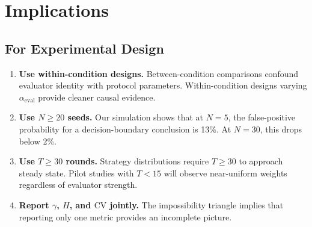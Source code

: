\documentclass[11pt]{article}
\begin{document}
\section{Implications}

\subsection{For Experimental Design}

\begin{enumerate}[leftmargin=*,nosep]
 \item \textbf{Use within-condition designs.} Between-condition comparisons confound evaluator identity with protocol parameters. Within-condition designs varying $\alpha_{\text{eval}}$ provide cleaner causal evidence.
 \item \textbf{Use $N \geq 20$ seeds.} Our simulation shows that at $N{=}5$, the false-positive probability for a decision-boundary conclusion is 13\%. At $N{=}30$, this drops below 2\%.
 \item \textbf{Use $T \geq 30$ rounds.} Strategy distributions require $T \geq 30$ to approach steady state. Pilot studies with $T < 15$ will observe near-uniform weights regardless of evaluator strength.
 \item \textbf{Report $\gamma$, $H$, and $\mathrm{CV}$ jointly.} The impossibility triangle implies that reporting only one metric provides an incomplete picture.
\end{enumerate}
\end{document}
